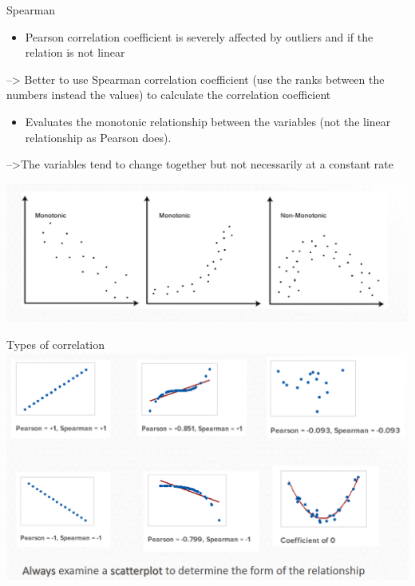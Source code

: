 \documentclass[
  ignorenonframetext,
]{beamer}
\providecommand{\tightlist}{%
  \setlength{\itemsep}{0pt}\setlength{\parskip}{0pt}}
\begin{document}
\begin{frame}{Spearman}
\label{spearman}
\begin{itemize}
\tightlist
\item
  Pearson correlation coefficient is severely affected by outliers and
  if the relation is not linear
\end{itemize}

--\textgreater{} Better to use Spearman correlation coefficient (use the
ranks between the numbers instead the values) to calculate the
correlation coefficient

\begin{itemize}
\tightlist
\item
  Evaluates the monotonic relationship between the variables (not the
  linear relationship as Pearson does).
\end{itemize}

--\textgreater The variables tend to change together but not necessarily
at a constant rate

\includegraphics{images/spearman.png}
\end{frame}

\begin{frame}{Types of correlation}
\label{types-of-correlation}
\includegraphics{images/comparison_correlation.png}
\end{frame}
\end{document}
